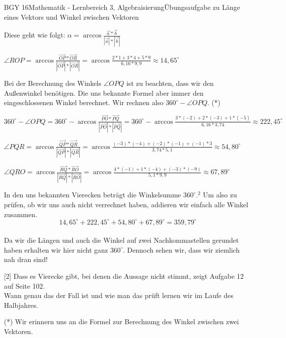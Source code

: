 \documentclass[oneside,openany,headings=optiontotoc,11pt,numbers=noenddot]{scrreprt}
\begin{document}
\begin{worksheet}{BGY 16}{Mathematik - Lernbereich 3, Algebraisierung}{Übungsaufgabe zu Länge eines Vektors und Winkel zwischen Vektoren}
\begin{framed}
		Diese geht wie folgt: \(\alpha = \arccos{\frac{\vec{a}*\vec{b}}{|\vec{a}|*|\vec{b}|}}\)\\
		\par
		\(\angle{ROP} = \arccos{\frac{\vec{OP}*\vec{OR}}{|\vec{OP}|*|\vec{OR}|}} =\arccos{\frac{2*1 + 3*4 + 5*9}{6,16*9,9}} \approx 14,65^{\circ}\)\\
		\par\noindent
		Bei der Berechnung des Winkels \(\angle{OPQ}\) ist zu beachten, dass wir den Außenwinkel benötigen. Die uns bekannte Formel aber immer den eingeschlossenen Winkel berechnet. Wir rechnen also \(360^{\circ}-\angle{OPQ}\). (*)\\
		\par
		\(360^{\circ} - \angle{OPQ} = 360^{\circ} -  \arccos{\frac{\vec{PO}*\vec{PQ}}{|\vec{PO}|*|\vec{PQ}|}} =360^{\circ} - \arccos{\frac{3*(-2)+2*(-3)+1*(-5)}{6,16*3,74}} \approx 222,45^{\circ}\)\\
		\par
		\(\angle{PQR} = \arccos{\frac{\vec{QP}*\vec{QR}}{|\vec{QP}|*|\vec{QR}|}} =\arccos{\frac{(-3)*(-4)+(-2)*(-1)+(-1)*3}{3,74*5,1}} \approx 54,80^{\circ}\)\\
		\par
		\(\angle{QRO} = \arccos{\frac{\vec{RQ}*\vec{RO}}{|\vec{RQ}|*|\vec{RO}|}} =\arccos{\frac{4*(-1)+1*(-4)+(-3)*(-9)}{5,1*9,9}} \approx 67,89^{\circ}\)\\
		\par\bigskip\noindent
		In den uns bekannten Vierecken beträgt die Winkelsumme \(360^{\circ}\text{.}^{2}\) Um also zu prüfen, ob wir uns auch nicht verrechnet haben, addieren wir einfach alle Winkel zusammen.\\
		\[14,65^{\circ} + 222,45^{\circ} + 54,80^{\circ} + 67,89^{\circ} = 359,79^{\circ}\]\\
		Da wir die Längen und auch die Winkel auf zwei Nachkommastellen gerundet haben erhalten wir hier nicht ganz \(360^{\circ}\). Dennoch sehen wir, dass wir ziemlich nah dran sind!\\
		\par\noindent
		\small{\color{codegray}[2] Dass es Vierecke gibt, bei denen die Aussage nicht stimmt, zeigt Aufgabe 12 auf Seite 102.\\Wann genau das der Fall ist und wie man das prüft lernen wir im Laufe des Halbjahres.}
		\end{framed}
		\begin{framed}
			\noindent
			(*) Wir erinnern uns an die Formel zur Berechnung des Winkel zwischen zwei Vektoren.\\

\end{framed}
\end{worksheet}
\end{document}
